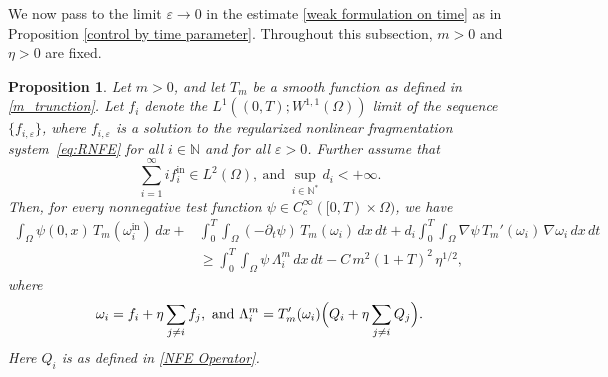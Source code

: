 \documentclass[a4paper,12pt,reqno]{amsart}
\theoremstyle{plain}
\newtheorem{prop}[thm]{Proposition}
\numberwithin{equation}{section}
\begin{document}
	
	We now pass to the limit $\varepsilon \to 0$ in the estimate \ref{weak formulation on time} as in Proposition \ref{control by time parameter}. Throughout this subsection, $m>0$ and $\eta>0$ are
	fixed.
	\begin{prop}\label{epsilon compactness in the inequation}
		Let $m>0$, and let $T_m$ be a smooth function as defined in \eqref{m_trunction}. Let $f_i$ 
		denote the $L^1((0,T); W^{1,1}(\Omega))$ limit of the sequence $\{f_{i,\varepsilon}\}$, 
		where $f_{i,\varepsilon}$ is a solution to the regularized nonlinear fragmentation system~\eqref{eq:RNFE} 
		for all $i \in \mathbb{N}$ and for all $\varepsilon > 0$. Further assume that
		\[
		\sum_{i=1}^{\infty} i f_i^{\mathrm{in}} \in L^2(\Omega),
		\ \text{and} \ 
		\sup_{i\in\mathbb{N}^*} d_i < +\infty.
		\]
		Then, for every nonnegative test function 
		$\psi \in C_c^\infty([0,T)\times\Omega)$, we have
		\begin{align}\label{control estimate on epsilon}
			\int_{\Omega} \psi(0,x)\,T_m(\omega_i^{\mathrm{in}})\,dx
			+&
			\int_{0}^{T}\!\!\int_{\Omega} (-\partial_t\psi)\,T_m(\omega_i)\,dx\,dt
			+
			d_i \int_{0}^{T}\!\!\int_{\Omega} \nabla\psi \, T_m'(\omega_i) \, \nabla\omega_i \,dx\,dt 
			\nonumber  \\
			&\ge
			\int_{0}^{T}\!\!\int_{\Omega} \psi\,\Lambda^m_i\,dx\,dt
			-
			C\,m^2(1+T)^2\,\eta^{1/2},
		\end{align}
		where
		\[
		\omega_i = f_i + \eta \sum_{j\ne i} f_j, 
		\ \text{and} \ 
		\Lambda^m_i = T_m'(\omega_i) \Bigl( Q_i + \eta \sum_{j\ne i} Q_j \Bigr).
		\]
		Here $Q_i$ is as defined in \eqref{NFE Operator}.
	\end{prop}
\end{document}
